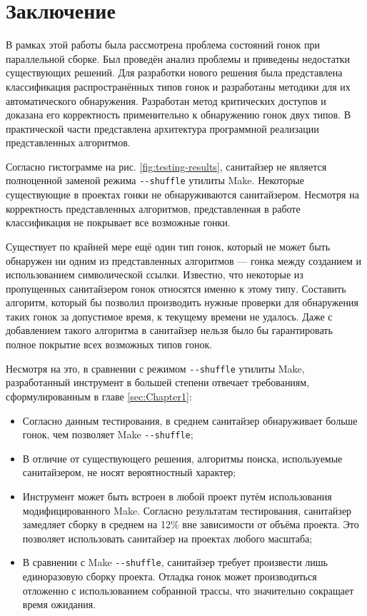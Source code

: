 \section{Заключение}
\label{sec:Chapter5} 


В рамках этой работы была рассмотрена проблема состояний гонок при параллельной сборке. Был проведён анализ проблемы и приведены недостатки существующих решений. Для разработки нового решения была представлена классификация распространённых типов гонок и разработаны методики для их автоматического обнаружения. Разработан метод критических доступов и доказана его корректность применительно к обнаружению гонок двух типов. В практической части представлена архитектура программной реализации представленных алгоритмов.

Согласно гистограмме на рис. \ref{fig:testing-results}, санитайзер не является полноценной заменой режима \texttt{{-}{-}shuffle} утилиты Make. Некоторые существующие в проектах гонки не обнаруживаются санитайзером. Несмотря на корректность представленных алгоритмов, представленная в работе классификация не покрывает все возможные гонки.

Существует по крайней мере ещё один тип гонок, который не может быть обнаружен ни одним из представленных алгоритмов --- гонка между созданием и использованием символической ссылки. Известно, что некоторые из пропущенных санитайзером гонок относятся именно к этому типу. Составить алгоритм, который бы позволил производить нужные проверки для обнаружения таких гонок за допустимое время, к текущему времени не удалось. Даже с добавлением такого алгоритма в санитайзер нельзя было бы гарантировать полное покрытие всех возможных типов гонок.

Несмотря на это, в сравнении с режимом \texttt{{-}{-}shuffle} утилиты Make, разработанный инструмент в большей степени отвечает требованиям, сформулированным в главе \ref{sec:Chapter1}:

\begin{itemize}
    \item Согласно данным тестирования, в среднем санитайзер обнаруживает больше гонок, чем позволяет Make \texttt{{-}{-}shuffle};
    \item В отличие от существующего решения, алгоритмы поиска, используемые санитайзером, не носят вероятностный характер;
    \item Инструмент может быть встроен в любой проект путём использования модифицированного Make. Согласно результатам тестирования, санитайзер замедляет сборку в среднем на 12\% вне зависимости от объёма проекта. Это позволяет использовать санитайзер на проектах любого масштаба;
    \item В сравнении с Make \texttt{{-}{-}shuffle}, санитайзер требует произвести лишь единоразовую сборку проекта. Отладка гонок может производиться отложенно с использованием собранной трассы, что значительно сокращает время ожидания.
\end{itemize}

